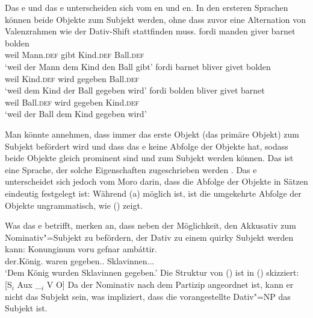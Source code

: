 Das e und das e unterscheiden sich vom en und
en. In den ersteren Sprachen können beide Objekte zum Subjekt werden, ohne dass zuvor
eine Alternation von Valenzrahmen wie der Dativ-Shift stattfinden muss.
\eal
\ex\label{ex-fordi-manden-giver-barnet-bolden} 
\gll fordi manden giver barnet bolden\\ 
     weil Mann.\textsc{def} gibt Kind.\textsc{def} Ball.\textsc{def}\\\danish
\glt `weil der Mann dem Kind den Ball gibt'
\ex\label{ex-child-was-given-ball-danish}
\gll fordi barnet bliver givet bolden\\ 
     weil Kind.\textsc{def} wird gegeben Ball.\textsc{def}\\
\glt `weil dem Kind der Ball gegeben wird'
\ex\label{ex-ball-was-given-child-danish}
\gll fordi bolden bliver givet barnet\\ 
     weil Ball.\textsc{def} wird gegeben Kind.\textsc{def}\\
\glt `weil der Ball dem Kind gegeben wird'
\zl

\noindent
Man könnte annehmen, dass immer das erste Objekt (das primäre Objekt) zum Subjekt befördert wird
und dass das e keine Abfolge der Objekte hat, sodass beide Objekte gleich prominent sind
und zum Subjekt werden können. Das  ist eine Sprache, der solche Eigenschaften zugeschrieben werden
\citep*{AMM2017a-u}. Das e unterscheidet sich jedoch vom Moro darin, dass die Abfolge der Objekte in Sätzen
eindeutig festgelegt ist: Während (a) möglich ist, ist die umgekehrte Abfolge der Objekte ungrammatisch, wie
() zeigt.
\z

\noindent
Was das e betrifft, merken \citet*[]{ZMT85a} an, dass neben der Möglichkeit,
den Akkusativ zum Nominativ"=Subjekt zu befördern, der Dativ zu einem quirky Subjekt werden kann:
\ea
\label{ex-dat-subj-passive-ditransitive-icelandic}
\gll Konunginum voru gefnar ambáttir.\\
     der.König.\DAT{} waren gegeben.\F.\PL{} Sklavinnen.\NOM.\F.\PL\\\icelandic
\glt `Dem König wurden Sklavinnen gegeben.'
\z
Die Struktur von () ist in () skizziert:
\ea
\label{sub-aux-v-o}
{}[S$_i$ Aux \_$_i$ V O] 
\z
Da der Nominativ nach dem Partizip angeordnet ist, kann er nicht das Subjekt sein, was impliziert, dass
die vorangestellte Dativ"=NP das Subjekt ist.

